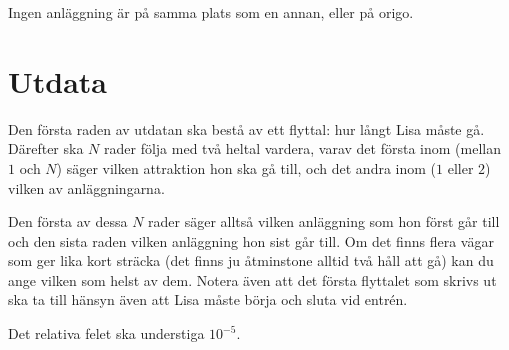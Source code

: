 Ingen anläggning är på samma plats som en annan, eller på origo.

\section*{Utdata}
Den första raden av utdatan ska bestå av ett flyttal: hur långt Lisa måste gå.
Därefter ska $N$ rader följa med två heltal vardera, varav det första inom (mellan $1$ och $N$) säger vilken attraktion hon ska gå till, och det andra inom ($1$ eller $2$) vilken av anläggningarna.

Den första av dessa $N$ rader säger alltså vilken anläggning som hon först går till och den sista raden vilken anläggning hon sist går till.
Om det finns flera vägar som ger lika kort sträcka (det finns ju åtminstone alltid två håll att gå) kan du ange vilken som helst av dem.
Notera även att det första flyttalet som skrivs ut ska ta till hänsyn även att Lisa måste börja och sluta vid entrén.

Det relativa felet ska understiga $10^{-5}$.
